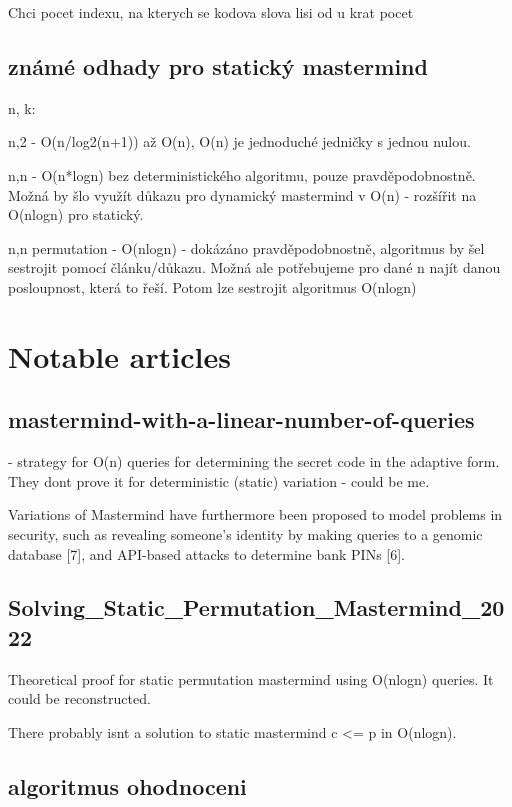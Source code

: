 Chci pocet indexu, na kterych se kodova slova lisi od u krat pocet 

\section{známé odhady pro statický mastermind}
n, k:

n,2 - O(n/log2(n+1)) až O(n), O(n) je jednoduché jedničky s jednou nulou. 

n,n - O(n*logn) bez deterministického algoritmu, pouze pravděpodobnostně. Možná by šlo využít důkazu pro dynamický mastermind v O(n) - rozšířit na O(nlogn) pro statický. 

n,n permutation - O(nlogn) - dokázáno pravděpodobnostně, algoritmus by šel sestrojit pomocí článku/důkazu. Možná ale potřebujeme pro dané n najít danou posloupnost, která to řeší. Potom lze sestrojit algoritmus O(nlogn)


\chapter{Notable articles}

\section{mastermind-with-a-linear-number-of-queries}
 - strategy for O(n) queries for determining the secret code in the adaptive form. They dont prove it for deterministic (static) variation - could be me.

Variations of Mastermind have furthermore been proposed to model problems in security,
such as revealing someone’s identity by making queries to a genomic database [7], and API-based
attacks to determine bank PINs [6].

\section{Solving_Static_Permutation_Mastermind_2022}
Theoretical proof for static permutation mastermind using O(nlogn) queries. It could be reconstructed.

There probably isnt a solution to static mastermind c <= p in O(nlogn).

\section{algoritmus ohodnoceni}

